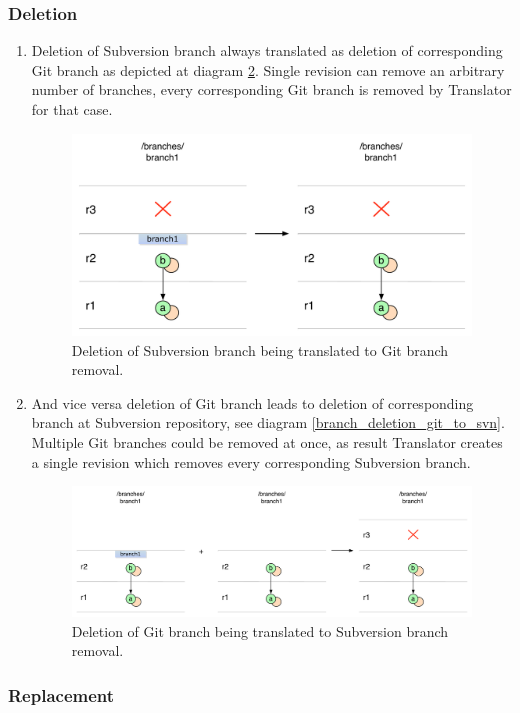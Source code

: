 \subsubsection{Deletion}

\begin{enumerate}
\compactlist
\item Deletion of Subversion branch always translated as deletion of corresponding Git branch as depicted at diagram \ref{branch_deletion_svn_to_git}. Single revision can remove an arbitrary number of branches, every corresponding Git branch is removed by Translator for that case.
\begin{figure}[!h]
\centering
\renewcommand{\figurename}{Diagram}
\includegraphics[width=\linewidth]{img/diagrams/branch_deletion_svn_to_git.pdf}
\caption{Deletion of Subversion branch being translated to Git branch removal.}
\label{branch_deletion_svn_to_git}
\end{figure}

\item And vice versa deletion of Git branch leads to deletion of corresponding branch at Subversion repository, see diagram \ref{branch_deletion_git_to_svn}. Multiple Git branches could be removed at once, as result Translator creates a single revision which removes every corresponding Subversion branch.
\begin{figure}[!h]
\centering
\renewcommand{\figurename}{Diagram}
\includegraphics[width=\linewidth]{img/diagrams/branch_deletion_git_to_svn.pdf}
\caption{Deletion of Git branch being translated to Subversion branch removal.}
\label{branch_deletion_svn_to_git}
\end{figure}
\end{enumerate}

\subsubsection{Replacement}
